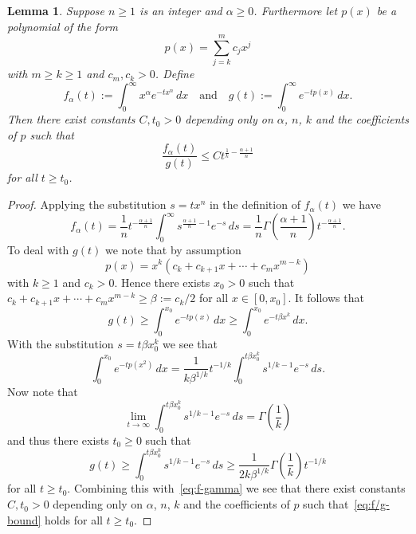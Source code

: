 \documentclass[a4paper, reqno,titlepage]{amsart}
\numberwithin{equation}{section}
\theoremstyle{plain}
\newtheorem{lemma}[theorem]{Lemma}
\theoremstyle{definition}
\theoremstyle{remark}
\begin{document}
%
\begin{lemma}
  \label{lem:f/g-lim}
  Suppose $n \geq 1$ is an integer and $\alpha\geq 0$. Furthermore let $p(x)$ be a polynomial of the form
  \begin{equation*}
    p(x) = \sum_{j=k}^m c_j x^{j}
  \end{equation*}
  with $m\geq k\geq 1$ and $c_m,c_k>0$. Define
  \begin{equation}
    f_\alpha(t) := \int_0^\infty x^\alpha e^{-tx^n} \,dx
    \quad\text{and}\quad
    g(t) := \int_0^\infty e^{-tp(x)} \,dx.
  \end{equation}
  Then there exist constants $C,t_0>0$ depending only on $\alpha$, $n$, $k$ and the coefficients of $p$ such that
  \begin{equation}
    \label{eq:f/g-bound}
    \frac{f_\alpha(t)}{g(t)}
    \leq Ct^{\frac{1}{k}-\frac{\alpha + 1}{n}}
  \end{equation}
  for all $t\geq t_0$.
\end{lemma}
\begin{proof}
  Applying the substitution $s=tx^n$ in the definition of $f_\alpha(t)$ we have
  \begin{equation}
    \label{eq:f-gamma}
    f_\alpha(t)
    = \frac{1}{n}t^{-\frac{\alpha+1}{n}}\int_0^\infty s^{\frac{\alpha+1}{n}-1}e^{-s}\,ds
    = \frac{1}{n}\Gamma\left(\frac{\alpha+1}{n}\right)t^{-\frac{\alpha+1}{n}}.
  \end{equation}
  To deal with $g(t)$ we note that by assumption
  \begin{equation*}
    p(x)=x^k(c_k+c_{k+1}x+\cdots+c_mx^{m-k})
  \end{equation*}
  with $k\geq 1$ and $c_k>0$. Hence there exists $x_0>0$ such that $c_k+c_{k+1}x+\cdots+c_mx^{m-k}\geq \beta:=c_k/2$ for all $x\in[0,x_0]$. It follows that
  \begin{equation*}
    g(t) \geq \int_0^{x_0} e^{-tp(x)} \,dx
    \geq \int_0^{x_0}e^{-t\beta x^k}\,dx.
  \end{equation*}
  With the substitution $s=t\beta x_0^k$ we see that
  \begin{equation*}
    \int_0^{x_0}e^{-tp(x^2)} \,dx
    =\frac{1}{k\beta^{1/k}}t^{-1/k}
    \int_0^{t\beta x_0^k}s^{1/k-1}e^{-s}\,ds.
  \end{equation*}
  Now note that
  \begin{equation*}
    \lim_{t\to\infty}\int_0^{t\beta x_0^k}s^{1/k-1}e^{-s}\,ds
    =\Gamma\left(\frac{1}{k}\right)
  \end{equation*}
  and thus there exists $t_0\geq 0$ such that
  \begin{equation*}
    g(t)\geq \int_0^{t\beta x_0^k}s^{1/k-1}e^{-s}\,ds
    \geq\frac{1}{2k\beta^{1/k}}\Gamma\left(\frac{1}{k}\right)t^{-1/k}
  \end{equation*}
  for all $t\geq t_0$. Combining this with~\eqref{eq:f-gamma} we see that there exist constants $C, t_0>0$ depending only on $\alpha$, $n$, $k$ and the coefficients of $p$ such that~\eqref{eq:f/g-bound} holds for all $t\geq t_0$.
\end{proof}
\end{document}
